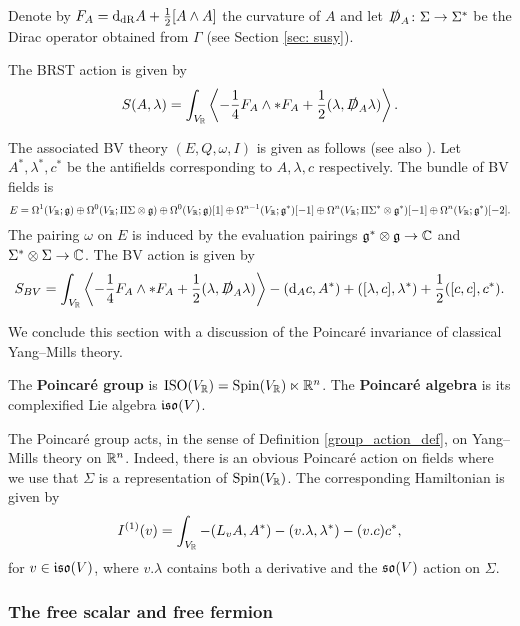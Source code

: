 \documentclass[10pt, oneside]{article}
\begin{document}
Denote by $F_A = {\rm d}_{\mathrm{dR}} A + \frac{1}{2}[A\wedge A]$ the curvature of $A$ and let $\slashed{D}_A \colon \Sigma \to \Sigma^*$ be the Dirac operator obtained from $\Gamma$ (see Section \ref{sec: susy}).

The BRST action is given by
\[S(A, \lambda) = \int_{V_\mathbb R} \left\langle -\frac{1}{4} F_A \wedge \ast F_A + \frac{1}{2}(\lambda, \slashed{D}_A \lambda)\right\rangle.\]

The associated BV theory $(E, Q, \omega, I)$ is given as follows (see also \cite[Section 3.1]{ElliottYoo1}). Let $A^*, \lambda^*, c^*$ be the antifields corresponding to $A, \lambda, c$ respectively. The bundle of BV fields is
\[E = \Omega^1(V_\mathbb R; \mathfrak g)\oplus \Omega^0(V_\mathbb R; \Pi\Sigma\otimes \mathfrak g)\oplus \Omega^0(V_\mathbb R; \mathfrak g)[1] \oplus \Omega^{n-1}(V_\mathbb R; \mathfrak g^*)[-1]\oplus \Omega^n(V_\mathbb R; \Pi\Sigma^*\otimes \mathfrak g^*)[-1]\oplus \Omega^n(V_\mathbb R; \mathfrak g^*)[-2].\]
The pairing $\omega$ on $E$ is induced by the evaluation pairings $\mathfrak{g}^*\otimes \mathfrak{g}\rightarrow \mathbb C$ and $\Sigma^*\otimes\Sigma\rightarrow\mathbb C$. The BV action is given by
\[S_{BV} = \int_{V_\mathbb R} \left\langle -\frac{1}{4} F_A \wedge \ast F_A + \frac{1}{2}(\lambda, \slashed{D}_A \lambda)\right\rangle - ({\rm d}_A c, A^*) + ([\lambda, c], \lambda^*) + \frac{1}{2}([c, c], c^*).\]

We conclude this section with a discussion of the Poincar\'e invariance of classical Yang--Mills theory.

\begin{definition}
The {\bf Poincar\'e group} is $\mathrm{ISO}(V_\mathbb R) = \mathrm{Spin}(V_\mathbb R) \ltimes \mathbb R^n$. The {\bf Poincar\'e algebra} is its complexified Lie algebra $\mathfrak{iso}(V)$.
\end{definition}

The Poincar\'e group acts, in the sense of Definition \ref{group_action_def}, on Yang--Mills theory on $\mathbb R^n$. Indeed, there is an obvious Poincar\'e action on fields where we use that $\Sigma$ is a representation of $\mathrm{Spin}(V_\mathbb R)$. The corresponding Hamiltonian is given by
\begin{equation}
I^{(1)}(v) = \int_{V_\mathbb R} -(L_{v}A, A^*) - (v.\lambda, \lambda^*) - (v.c)c^*,
\label{eq:Poincareaction}
\end{equation}
for $v\in\mathfrak{iso}(V)$, where $v.\lambda$ contains both a derivative and the $\mathfrak{so}(V)$ action on $\Sigma$.

\subsubsection{The free scalar and free fermion}
\end{document}
